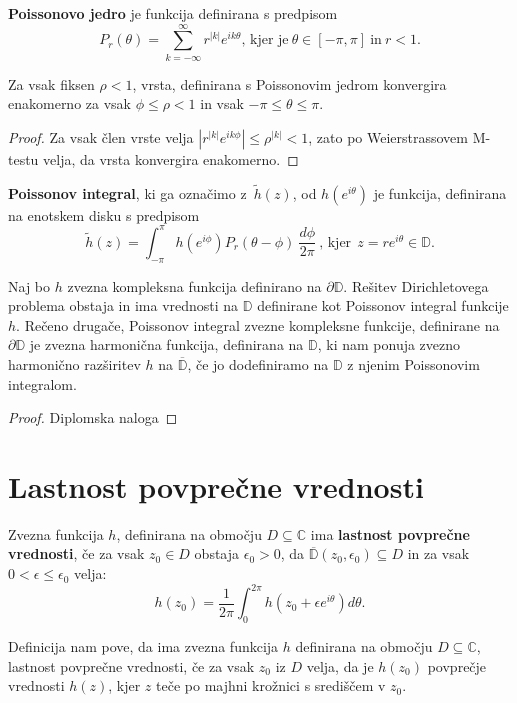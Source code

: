 \documentclass[mat1]{fmfdelo}
\newcommand{\C}{\mathbb C}
\begin{document}
    \begin{definicija}
        \textbf{Poissonovo jedro} je funkcija definirana s predpisom
        $$
           P_r(\theta) = \sum_{k = -\infty}^{\infty}{r^{|k|} e^{i k \theta}}\text{, kjer je}~\theta \in [-\pi, \pi]~\text{in}~ r < 1.
        $$
    \end{definicija}
    \begin{trditev}
        Za vsak fiksen $\rho < 1$, vrsta, definirana s Poissonovim jedrom konvergira enakomerno za vsak $\phi \leq \rho < 1$ in vsak $ -\pi \leq \theta \leq \pi$.
    \end{trditev}
    \begin{proof}
        Za vsak člen vrste velja $|r^{|k|} e^{i k \phi}| \leq \rho^{|k|} < 1$, zato po Weierstrassovem M-testu velja, da vrsta konvergira enakomerno.
    \end{proof}

    \begin{definicija}
        \textbf{Poissonov integral}, ki ga označimo z~$\widetilde{h}(z)$, od $h(e^{i\theta})$ je funkcija, definirana na enotskem disku s predpisom
        $$
        \widetilde{h}(z) = \int_{-\pi}^{\pi}{h(e^{i\phi}) P_r(\theta - \phi)~\frac{d\phi}{2 \pi}}~\text{, kjer}~~z = r e^{i\theta} \in \mathbb{D}.
        $$
     \end{definicija}
     \begin{trditev}
        Naj bo $h$ zvezna kompleksna funkcija definirano na $\partial \mathbb{D}$. Rešitev Dirichletovega problema obstaja in ima vrednosti na $\mathbb{D}$ definirane kot Poissonov integral funkcije $h$.
        \newline
        Rečeno drugače, Poissonov integral zvezne kompleksne funkcije, definirane na $\partial \mathbb{D}$ je zvezna harmonična funkcija, definirana na $\mathbb{D}$, ki nam ponuja zvezno harmonično razširitev $h$ na $\overline{\mathbb{D}}$, če jo dodefiniramo na $\mathbb{D}$ z njenim Poissonovim integralom.
     \end{trditev}
     \begin{proof}
        Diplomska naloga
     \end{proof}

\section{Lastnost povprečne vrednosti}
     \begin{definicija}
        Zvezna funkcija $h$, definirana na območju $D \subseteq \C$ ima \textbf{lastnost povprečne vrednosti}, če za vsak $z_0 \in D$ obstaja $\epsilon_0 > 0$, da $\overline{\mathbb{D}}(z_0, \epsilon_0) \subseteq D$ in za vsak $0 < \epsilon \leq \epsilon_0 $ velja:
        $$
            h(z_0) = \frac{1}{2 \pi} \int_{0}^{2 \pi}{h(z_0 + \epsilon e^{i \theta}) d\theta}.
        $$
    \end{definicija}
    \begin{opomba}
        Definicija nam pove, da ima zvezna funkcija $h$ definirana na območju $D \subseteq \C$, lastnost povprečne vrednosti, če za vsak $z_0$ iz $D$ velja, 
        da je $h(z_0)$ povprečje vrednosti $h(z)$, kjer $z$ teče po majhni krožnici s središčem v $z_0$.
    \end{opomba}
\end{document}
